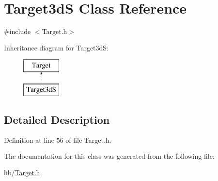 \hypertarget{class_target3d_s}{}\section{Target3dS Class Reference}
\label{class_target3d_s}


{\ttfamily \#include $<$Target.\+h$>$}

Inheritance diagram for Target3dS\+:\begin{figure}[H]
\begin{center}
\leavevmode
\includegraphics[height=2.000000cm]{class_target3d_s}
\end{center}
\end{figure}


\subsection{Detailed Description}


Definition at line 56 of file Target.\+h.



The documentation for this class was generated from the following file\+:\begin{DoxyCompactItemize}
\item 
lib/\hyperlink{_target_8h}{Target.\+h}\end{DoxyCompactItemize}
